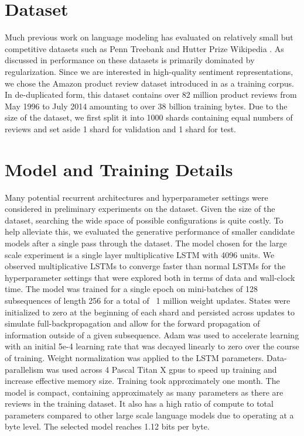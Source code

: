 \section{Dataset}
Much previous work on language modeling has evaluated on relatively small but competitive datasets such as Penn Treebank \cite{marcus1993building} and Hutter Prize Wikipedia \cite{hutterhuman}. As discussed in \citet{jozefowicz2016exploring} performance on these datasets is primarily dominated by regularization. Since we are interested in high-quality sentiment representations, we chose the Amazon product review dataset introduced in \citet{mcauley2015inferring} as a training corpus. In de-duplicated form, this dataset contains over 82 million product reviews from May 1996 to July 2014 amounting to over 38 billion training bytes. Due to the size of the dataset, we first split it into 1000 shards containing equal numbers of reviews and set aside 1 shard for validation and 1 shard for test.

\section{Model and Training Details} Many potential recurrent architectures and hyperparameter settings were considered in preliminary experiments on the dataset. Given the size of the dataset, searching the wide space of possible configurations is quite costly. To help alleviate this, we evaluated the generative performance of smaller candidate models after a single pass through the dataset. The model chosen for the large scale experiment is a single layer multiplicative LSTM \cite{krause2016multiplicative} with 4096 units. We observed multiplicative LSTMs to converge faster than normal LSTMs for the hyperparameter settings that were explored both in terms of data and wall-clock time. The model was trained for a single epoch on mini-batches of 128 subsequences of length 256 for a total of ~1 million weight updates. States were initialized to zero at the beginning of each shard and persisted across updates to simulate full-backpropagation and allow for the forward propagation of information outside of a given subsequence. Adam \cite{kingma2014adam} was used to accelerate learning with an initial 5e-4 learning rate that was decayed linearly to zero over the course of training. Weight normalization \cite{salimans2016weight} was applied to the LSTM parameters. Data-parallelism was used across 4 Pascal Titan X gpus to speed up training and increase effective memory size. Training took approximately one month. The model is compact, containing approximately as many parameters as there are reviews in the training dataset. It also has a high ratio of compute to total parameters compared to other large scale language models due to operating at a byte level. The selected model reaches 1.12 bits per byte.

